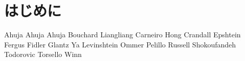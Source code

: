 \section{はじめに}



Ahuja\cite{Ahuja_1982}
Ahuja\cite{Ahuja_1996}
Ahuja\cite{Ahuja_2007}
Bouchard\cite{Bouchard_2005}
Liangliang\cite{Liangliang_2007}
Carneiro\cite{Carneiro_2006}
Hong\cite{Hong_2006}
Crandall\cite{Crandall_2005}
Epshtein\cite{Epshtein_2007}
Fergus\cite{Fergus_2003}
Fidler\cite{Fidler_2007}
Glantz\cite{Glantz_2004}
Ya\cite{Ya_2006}
Levinshtein\cite{Levinshtein_2005}
Ommer\cite{Ommer_2007}
Pelillo\cite{Pelillo_1999}
Russell\cite{Russell_2006}
Shokoufandeh\cite{Shokoufandeh_2006}
Todorovic\cite{Todorovic_2006}
Torsello\cite{Torsello_2003}
Winn\cite{Winn_2005}

